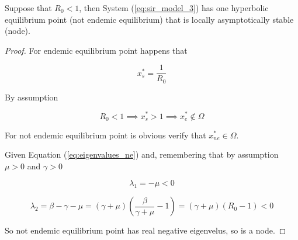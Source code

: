\begin{theorem}
\label{th:R0_minor_then_1_Equilibria}
Suppose that $R_0 < 1$, then System (\ref{eq:sir_model_3}) has one hyperbolic equilibrium point (not endemic equilibrium) that is locally asymptotically stable (node).
\end{theorem}

\begin{proof}
For endemic equilibrium point happens that

\begin{equation}
    x_s^* = \frac{1}{R_0}
\end{equation}

By assumption

\begin{equation}
    R_0 < 1 \implies x_s^* > 1 \implies x_e^* \not\in \Omega
\end{equation}

For not endemic equilibrium point is obvious verify that $x_{ne}^* \in \Omega$.

Given Equation (\ref{eq:eigenvalues_ne}) and, remembering that by assumption $\mu > 0$ and $\gamma > 0$

\begin{equation}
    \lambda_1 = -\mu < 0
\end{equation}

\begin{equation}
    \lambda_2 = \beta - \gamma - \mu = (\gamma + \mu)\left(\frac{\beta}{\gamma + \mu} - 1\right) = (\gamma + \mu)(R_0 - 1) < 0
\end{equation}

So not endemic equilibrium point has real negative eigenvelus, so is a node.
\end{proof}